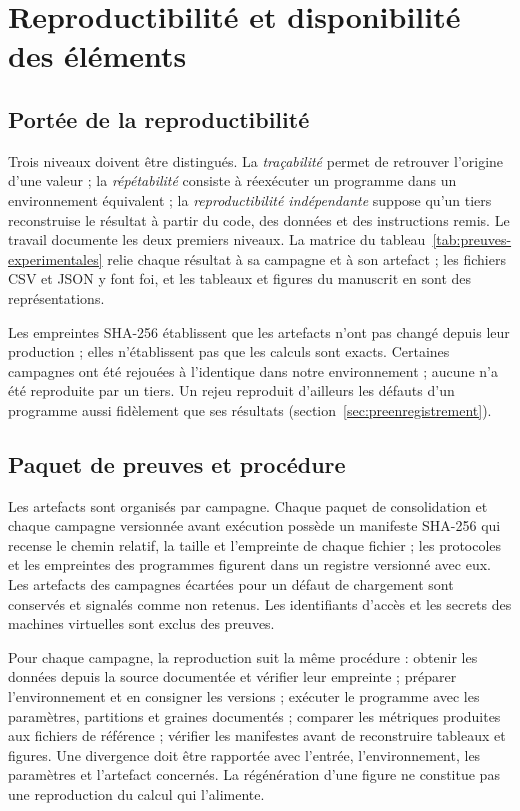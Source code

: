 \section{Reproductibilité et disponibilité des éléments}
\label{chap:reproductibilite}

\subsection{Portée de la reproductibilité}

Trois niveaux doivent être distingués. La \emph{traçabilité} permet de retrouver l'origine
d'une valeur ; la \emph{répétabilité} consiste à réexécuter un programme dans un
environnement équivalent ; la \emph{reproductibilité indépendante} suppose qu'un tiers
reconstruise le résultat à partir du code, des données et des instructions remis. Le
travail documente les deux premiers niveaux. La matrice du
tableau~\ref{tab:preuves-experimentales} relie chaque résultat à sa campagne et à son
artefact ; les fichiers CSV et JSON y font foi, et les tableaux et figures du manuscrit en
sont des représentations.

Les empreintes SHA-256 établissent que les artefacts n'ont pas changé depuis leur
production ; elles n'établissent pas que les calculs sont exacts. Certaines campagnes ont été
rejouées à l'identique dans notre environnement ; aucune n'a été reproduite par un
tiers. Un rejeu reproduit d'ailleurs les défauts d'un programme aussi fidèlement que ses
résultats (section~\ref{sec:preenregistrement}).

\subsection{Paquet de preuves et procédure}

Les artefacts sont organisés par campagne. Chaque paquet de consolidation et chaque
campagne versionnée avant exécution possède un manifeste SHA-256 qui recense le chemin
relatif, la taille et l'empreinte de chaque fichier ; les protocoles et les empreintes des
programmes figurent dans un registre versionné avec eux. Les artefacts des campagnes écartées
pour un défaut de chargement sont conservés et signalés comme non retenus. Les identifiants
d'accès et les secrets des machines virtuelles sont exclus des preuves.

Pour chaque campagne, la reproduction suit la même procédure : obtenir les données depuis la
source documentée et vérifier leur empreinte ; préparer l'environnement et en consigner les
versions ; exécuter le programme avec les paramètres, partitions et graines documentés ;
comparer les métriques produites aux fichiers de référence ; vérifier les manifestes avant de
reconstruire tableaux et figures. Une divergence doit être rapportée avec l'entrée,
l'environnement, les paramètres et l'artefact concernés. La régénération d'une figure ne
constitue pas une reproduction du calcul qui l'alimente.

